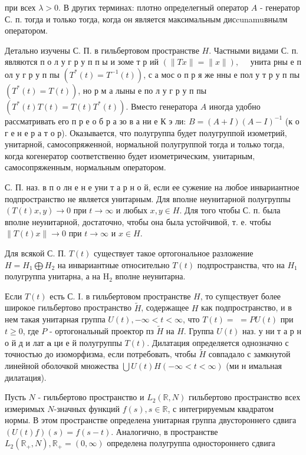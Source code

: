 \documentclass[10pt]{article}
\begin{document}
при всех $\lambda>0$. В других терминах: плотно определегный оператор $A$ - генератор С. п. тогда и только тогда, когда он является максимальным дисcunamuвнылм оператором.



Детально изучены С. П. в гильбертовом пространстве $H$. Частными видами С. п. являются п о л у г р у п п ы и зоме т р ий $(\|T x\|=\|x\|), \quad$ унита рны е п ол у г р у п пы $\left(T^{*}(t)=T^{-1}(t)\right)$, с а мос о п р я же нны е пол у т р у п пы $\left(T^{*}(t)=T(t)\right)$, но р м а лыны е по л у г р у п пы $\left(T^{*}(t) T(t)=T(t) T^{*}(t)\right)$. Вместо генератора $A$ иногда удобно рассматривать его п р е о б р а зо в а ни е К э ли: $B=(A+I)(A-I)^{-1}$ (к о г е н е р а т о р). Оказывается, что полугруппа будет полугруппой изометрий, унитарной, самосопряженноӥ, нормальной полугруппой тогда и только тогда, когда когенератор соответственно будет изометрическим, унитарным, самосопряженным, нормальным оператором.



С. П. наз. в п о лн е н е уни т а р н о й, если ее сужение на любое инвариантное подпространство не является унитарным. Для вполне неунитарной полугруппы $(T(t) x, y) \rightarrow 0$ при $t \rightarrow \infty$ и любых $x, y \in H$. Для того чтобы С. п. была вполне неунитарной, достаточно, чтобы она была устойчивой, т. е. чтобы $\|T(t) x\| \rightarrow 0$ при $t \rightarrow \infty$ и $x \in H$.



Для всякой С. П. $T(t)$ существует такое ортогональное разложение $H=H_{1} \bigoplus H_{2}$ на инвариантные относительно $T(t)$ подпространства, что на $H_{1}$ полугруппа унитарна, а на $\mathrm{H}_{2}$ вполне неунитарна.



Если $T(t)$ есть С. I. в гильбертовом пространстве $H$, то супцествует более широкое гильбертово пространство $\tilde{H}$, содержащее $H$ как подпространство, и в нем такая унитарная группа $U(t),-\infty<t<\infty$, что $T(t)=$ $=P U(t)$ при $t \geqslant 0$, где $P$ - ортогональный проектор пз $\tilde{H}$ на $H$. Группа $U(t)$ наз. у ни т а р н о й д и лат $\mathbf{a}$ ци е й полугруппы $T(t)$. Дилатация определяется однозначно с точностью до изоморфизма, если потребовать, чтобы $\tilde{H}$ совпадало с замкнутой линейной оболочкой множества $\bigcup U(t) H(-\infty<t<\infty)$ (ми н имальная дилатация).



Пусть $N$ - гильбертово пространство и $L_{2}(\mathbb{R}, N)$ гильбертово пространство всех измеримых $N$-значных функций $f(s), s \in \mathbb{R}$, с интегрируемым квадратом нормы. В этом пространстве определена унитарная группа двустороннего сдвига $(U(t) f)(s)=f(s-t)$. Аналогично, в пространстве $L_{2}\left(\mathbb{R}_{+}, N\right), \mathbb{R}_{+}=(0, \infty)$ определена полугруппа одностороннего сдвига
\end{document}
